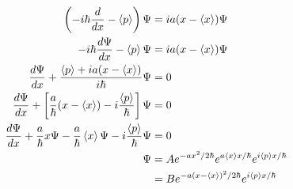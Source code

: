 \documentclass{article}
\begin{document}
\setcounter{subsection}{16}
\subsection{}

\begin{align*}
  \left( -i \hbar \frac{d}{d x} - \braket{p} \right) \Psi                                                         & = i a (x - \braket{x}) \Psi                                                    \\
  -i \hbar \frac{d \Psi}{d x} - \braket{p} \Psi                                                                   & = i a (x - \braket{x}) \Psi                                                    \\
  \frac{d \Psi}{d x} + \frac{\braket{p} + i a (x - \braket{x})}{i \hbar} \Psi                                     & = 0                                                                            \\
  \frac{d \Psi}{d x} + \left[ \frac{a}{\hbar} (x - \braket{x}) - i \frac{\braket{p}}{\hbar} \right] \Psi          & = 0                                                                            \\
  \frac{d \Psi}{d x} + \frac{a}{\hbar} x \Psi - \frac{a}{\hbar} \braket{x} \Psi - i \frac{\braket{p}}{\hbar} \Psi & = 0                                                                            \\
  \Psi                                                                                                            & = A e^{-a x^2 / 2 \hbar} e^{a \braket{x} x / \hbar} e^{i \braket{p} x / \hbar} \\
                                                                                                                  & = B e^{-a (x - \braket{x})^2 / 2 \hbar} e^{i \braket{p} x / \hbar}
\end{align*}

\subsection{}
\end{document}
